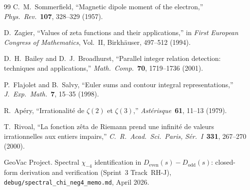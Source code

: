 \documentclass[11pt]{article}
\begin{document}
\begin{thebibliography}{99}
C.~M.~Sommerfield, ``Magnetic dipole moment of the electron,''
\textit{Phys.~Rev.}\ \textbf{107}, 328--329 (1957).

D.~Zagier, ``Values of zeta functions and their applications,''
in \textit{First European Congress of Mathematics}, Vol.~II,
Birkh\"auser, 497--512 (1994).

D.~H.~Bailey and D.~J.~Broadhurst, ``Parallel integer relation
detection: techniques and applications,''
\textit{Math.~Comp.}\ \textbf{70}, 1719--1736 (2001).

P.~Flajolet and B.~Salvy, ``Euler sums and contour integral
representations,''
\textit{J.~Exp.~Math.}\ \textbf{7}, 15--35 (1998).

R.~Ap\'ery, ``Irrationalit\'e de $\zeta(2)$ et $\zeta(3)$,''
\textit{Ast\'erisque}\ \textbf{61}, 11--13 (1979).

T.~Rivoal, ``La fonction z\^eta de Riemann prend une infinit\'e de
valeurs irrationnelles aux entiers impairs,''
\textit{C.~R.~Acad.~Sci.~Paris, S\'er.~I}\ \textbf{331}, 267--270
(2000).

GeoVac Project.  Spectral $\chi_{-4}$ identification in
$D_{\mathrm{even}}(s) - D_{\mathrm{odd}}(s)$: closed-form derivation
and verification (Sprint~3 Track~RH-J),
\texttt{debug/spectral\_chi\_neg4\_memo.md}, April 2026.

\end{thebibliography}
\end{document}
